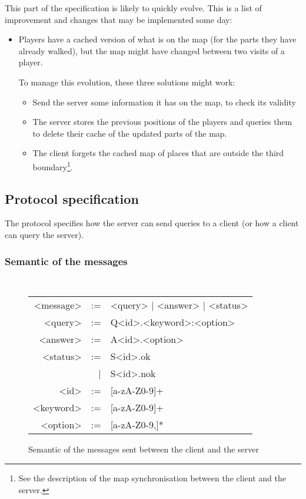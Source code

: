 \documentclass{article}
\begin{document}
This part of the specification is likely to quickly evolve. This is a list of
improvement and changes that may be implemented some day:
\begin{itemize}
	\item Players have a cached version of what is on the map (for the parts
	they have already walked), but the map might have changed between two visits
	of a player.

	To manage this evolution, these three solutions might work:
	\begin{itemize}
	\item Send the server some information it has on the map, to check its
	validity
	\item The server stores the previous positions of the players and queries
	them to delete their cache of the updated parts of the map.
	\item The client forgets the cached map of places that are outside the
	third boundary\footnote{See the description of the map synchronisation
	between the client and the server.}.
	\end{itemize}
\end{itemize}

\subsection{Protocol specification}
The protocol specifies how the server can send queries to a client (or how a
client can query the server).

\subsubsection{Semantic of the messages}
\begin{figure}[H]
	\centering
	{\tt
	\begin{tabular}{rrl}
		<message> & := & <query> | <answer> | <status>\\
		<query> & := & Q<id>.<keyword>:<option>\\
		<answer> & := &A<id>.<option>\\
		<status> & := &S<id>.ok\\
			&|& S<id>.nok\\
		<id> &:= & [a-zA-Z0-9]+\\
		<keyword> &:= & [a-zA-Z0-9]+\\
		<option> &:= & [a-zA-Z0-9,]*\\
	\end{tabular}
	}
	\caption{Semantic of the messages sent between the client and the server}
\end{figure}
\end{document}
